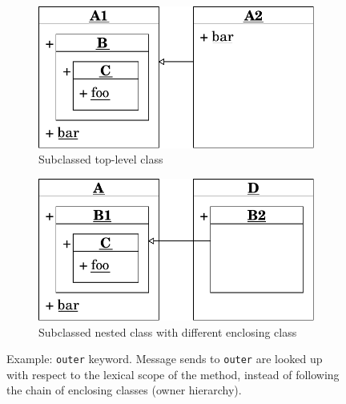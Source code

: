 \begin{figure}[!htp]
\begin{subfigure}[b]{\textwidth}
	\centering
	\includegraphics[scale=0.75]{outer_keyword.pdf}
	\caption{Subclassed top-level class}
	\label{fig:concept_outer_1}
\end{subfigure}

\vspace{15pt}

\begin{subfigure}[b]{\textwidth}
	\centering
	\includegraphics[scale=0.75]{outer_keyword_2.pdf}
	\caption{Subclassed nested class with different enclosing class}
	\label{fig:concept_outer_2}
\end{subfigure}

\caption[Example: \texttt{outer} keyword]{Example: \texttt{outer} keyword. Message sends to \texttt{outer} are looked up with respect to the lexical scope of the method, instead of following the chain of enclosing classes (owner hierarchy).}
\end{figure}


